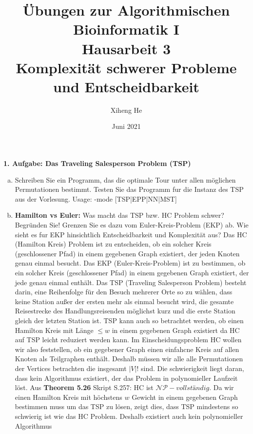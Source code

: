\documentclass{article}
\title{Übungen zur Algorithmischen Bioinformatik I\\
Hausarbeit 3\\
Komplexität schwerer Probleme und Entscheidbarkeit}
\author{Xiheng He }
\date{Juni 2021}
\begin{document}
\maketitle
\begin{flushleft}
\textbf{1. Aufgabe: Das Traveling Salesperson Problem (TSP)}
\newline
\begin{enumerate}[(a)]
\item Schreiben Sie ein Programm, das die optimale Tour unter allen möglichen Permutationen bestimmt. 
Testen Sie das Programm fur die Instanz des TSP aus der Vorlesung. 
\newline 
Usage: -mode [TSP|EPP|NN|MST]
\item \textbf{Hamilton vs Euler:} Was macht das TSP bzw. HC Problem schwer? Begründen Sie! Grenzen
Sie es dazu vom Euler-Kreis-Problem (EKP) ab. Wie sieht es fur EKP hinsichtlich Entscheidbarkeit
und Komplexität aus?
\newline
Das HC (Hamilton Kreis) Problem ist zu entscheiden, ob ein solcher Kreis (geschlossener Pfad) in einem gegebenen 
Graph existiert, der jeden Knoten genau einmal besucht. 
\newline
Das EKP (Euler-Kreis-Problem) ist zu bestimmen, 
ob ein solcher Kreis (geschlossener Pfad) in einem gegebenen Graph existiert, der jede genau einmal enthält.
\newline
Das TSP (Traveling Salesperson Problem) besteht darin, eine Reihenfolge für den Besuch mehrerer Orte so zu wählen, 
dass keine Station außer der ersten mehr als einmal besucht wird, die gesamte Reisestrecke des Handlungsreisenden 
möglichst kurz und die erste Station gleich der letzten Station ist. TSP kann auch so betrachtet werden, ob einen 
Hamilton Kreis mit Länge $\leq w$  in einem gegebenen Graph existiert da HC auf TSP leicht reduziert werden kann.
\newline
Im Einscheidungsproblem HC wollen wir also feststellen, ob ein gegebener Graph einen einfahcne Kreis auf allen Knoten
als Teilgraphen enthält. Deshalb müssen wir alle alle Permutationen der Vertices betrachten die insgesamt $|V|!$ sind.
Die schwierigkeit liegt daran, dass kein Algorithmus existiert, der das Problem in polynomieller Laufzeit löst. 
\newline
Aus \textbf{Theorem 5.26} Skript S.257: HC ist $\mathcal{N}\mathcal{P}-vollständig$.
\newline
Da wir einen Hamilton Kreis mit höchstens $w$ Gewicht in einem gegebenen Graph bestimmen muss um das TSP zu lösen,
zeigt dies, dass TSP mindestens so schwierig ist wie das HC Problem. Deshalb existiert auch kein polynomieller Algorithmus

\end{enumerate}
\end{flushleft}
\end{document}
